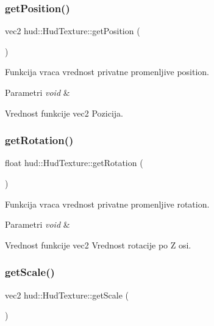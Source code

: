 \subsubsection{\texorpdfstring{get\+Position()}{getPosition()}}
{\footnotesize\ttfamily vec2 hud\+::\+Hud\+Texture\+::get\+Position (\begin{DoxyParamCaption}{ }\end{DoxyParamCaption})}



Funkcija vraca vrednost privatne promenljive position. 


\begin{DoxyParams}{Parametri}
{\em void} & \\
\hline
\end{DoxyParams}
\begin{DoxyReturn}{Vrednost funkcije}
vec2 Pozicija. 
\end{DoxyReturn}
\mbox{\label{classhud_1_1HudTexture_aa171b3bf1cb31ed030600beca32ed77c}} 
\subsubsection{\texorpdfstring{get\+Rotation()}{getRotation()}}
{\footnotesize\ttfamily float hud\+::\+Hud\+Texture\+::get\+Rotation (\begin{DoxyParamCaption}{ }\end{DoxyParamCaption})}



Funkcija vraca vrednost privatne promenljive rotation. 


\begin{DoxyParams}{Parametri}
{\em void} & \\
\hline
\end{DoxyParams}
\begin{DoxyReturn}{Vrednost funkcije}
vec2 Vrednost rotacije po Z osi. 
\end{DoxyReturn}
\mbox{\label{classhud_1_1HudTexture_a3ad68d37457abc9456133e03b0835c40}} 
\subsubsection{\texorpdfstring{get\+Scale()}{getScale()}}
{\footnotesize\ttfamily vec2 hud\+::\+Hud\+Texture\+::get\+Scale (\begin{DoxyParamCaption}{ }\end{DoxyParamCaption})}



